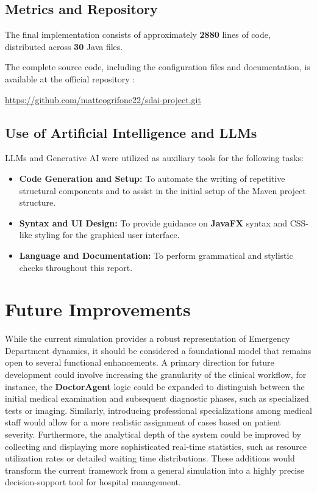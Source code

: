 \documentclass{article}[12pt]
\begin{document}
\subsection{Metrics and Repository}
The final implementation consists of approximately \textbf{2880} lines of code, distributed across \textbf{30} Java files.

\noindent
The complete source code, including the configuration files and documentation, is available at the official repository \cite{grifone2026edmas}:
\begin{center}
    \url{https://github.com/matteogrifone22/sdai-project.git}
\end{center}

\subsection{Use of Artificial Intelligence and LLMs}
\label{subsec:ai-disclosure}

LLMs and Generative AI were utilized as auxiliary tools for the following tasks:
\begin{itemize}
    \item \textbf{Code Generation and Setup:} To automate the writing of repetitive structural components and to assist in the initial setup of the Maven project structure.
    \item \textbf{Syntax and UI Design:} To provide guidance on \textbf{JavaFX} syntax and CSS-like styling for the graphical user interface.
    \item \textbf{Language and Documentation:} To perform grammatical and stylistic checks throughout this report.
\end{itemize}


\section{Future Improvements}
\label{subsec:future-work}

While the current simulation provides a robust representation of Emergency Department dynamics, it should be considered a foundational model that remains open to several functional enhancements.
A primary direction for future development could involve increasing the granularity of the clinical workflow, for instance, the \textbf{DoctorAgent} logic could be expanded to distinguish between the initial medical examination and subsequent diagnostic phases,
such as specialized tests or imaging. Similarly, introducing professional specializations among medical staff would allow for a more realistic assignment of cases based on patient severity.
Furthermore, the analytical depth of the system could be improved by collecting and displaying more sophisticated real-time statistics, such as resource utilization rates or detailed waiting time distributions.
These additions would transform the current framework from a general simulation into a highly precise decision-support tool for hospital management.




\end{document}
